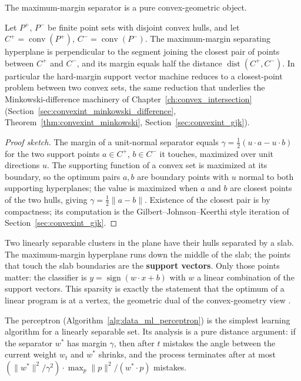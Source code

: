 The maximum-margin separator is a pure convex-geometric object.

\begin{theorem}\label{thm:data_ml_margin_hull}
  Let $P^+$, $P^-$ be finite point sets with disjoint convex hulls, and let
  $C^+ = \operatorname{conv}(P^+)$, $C^- = \operatorname{conv}(P^-)$. The
  maximum-margin separating hyperplane is perpendicular to the segment
  joining the closest pair of points between $C^+$ and $C^-$, and its margin
  equals half the distance $\operatorname{dist}(C^+, C^-)$. In particular
  the hard-margin support vector machine reduces to a closest-point problem
  between two convex sets, the same reduction that underlies the
  Minkowski-difference machinery of Chapter~\ref{ch:convex_intersection}
  (Section~\ref{sec:convexint_minkowski_difference},
  Theorem~\ref{thm:convexint_minkowski}, Section~\ref{sec:convexint_gjk}).
\end{theorem}

\begin{proof}[Proof sketch]
  The margin of a unit-normal separator equals $\gamma = \frac{1}{2}(u \cdot
  a - u \cdot b)$ for the two support points $a \in C^+$, $b \in C^-$ it
  touches, maximized over unit directions $u$. The supporting function of a
  convex set is maximized at its boundary, so the optimum pairs $a, b$ are
  boundary points with $u$ normal to both supporting hyperplanes; the value
  is maximized when $a$ and $b$ are closest points of the two hulls, giving
  $\gamma = \frac{1}{2}\|a - b\|$. Existence of the closest pair is by
  compactness; its computation is the Gilbert--Johnson--Keerthi style
  iteration of Section~\ref{sec:convexint_gjk}.
\end{proof}

\begin{example}\label{ex:data_ml_svm}
  Two linearly separable clusters in the plane have their hulls separated by
  a slab. The maximum-margin hyperplane runs down the middle of the slab;
  the points that touch the slab boundaries are the \textbf{support
  vectors}. Only those points matter: the classifier
  is $y = \operatorname{sign}(w \cdot x + b)$ with $w$ a linear combination
  of the support vectors. This sparsity is exactly the statement that the
  optimum of a linear program is at a vertex, the geometric dual of the
  convex-geometry view \cite{bishop2006,muller2001}.
\end{example}

\begin{example}\label{ex:data_ml_perceptron}
  The perceptron (Algorithm~\ref{alg:data_ml_perceptron}) is the simplest
  learning algorithm for a linearly separable set. Its analysis is a pure
  distance argument: if the separator $w^*$ has margin $\gamma$, then after
  $t$ mistakes the angle between the current weight $w_t$ and $w^*$ shrinks,
  and the process terminates after at most $(\|w^*\|^2 / \gamma^2)
  \cdot \max_p \|p\|^2 / (w^* \cdot p)$ mistakes.
\end{example}

